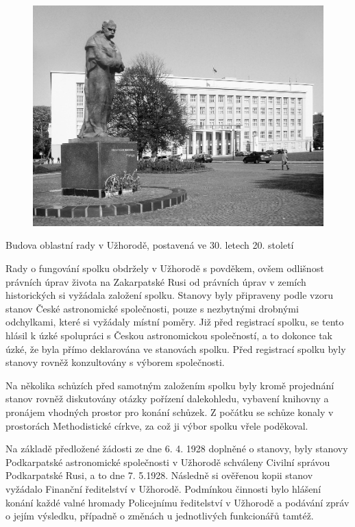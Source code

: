 \documentclass[10pt,a5paper,twoside]{book}
\begin{document}
\begin{figure}[!htbp]
 \centering
  \includegraphics*[width=12cm]{dum.jpg}
\end{figure}
Budova oblastní rady v Užhorodě, postavená ve 30. letech 20. století\\

\par Rady o fungování spolku obdržely v Užhorodě s povděkem, ovšem odlišnost právních úprav života na Zakarpatské Rusi od právních úprav v zemích historických si vyžádala založení spolku. Stanovy byly připraveny podle vzoru stanov České astronomické společnosti, pouze s nezbytnými drobnými odchylkami, které si vyžádaly místní poměry. Již před registrací spolku, se tento hlásil k úzké spolupráci s Českou astronomickou společností, a to dokonce tak úzké, že byla přímo deklarována ve stanovách spolku. Před registrací spolku byly stanovy rovněž konzultovány s výborem společnosti.
\par Na několika schůzích před samotným založením spolku byly kromě projednání stanov rovněž diskutovány otázky pořízení dalekohledu, vybavení knihovny a pronájem vhodných prostor pro konání schůzek. Z počátku se schůze konaly v prostorách Methodistické církve, za což ji výbor spolku vřele poděkoval.
\par Na základě předložené žádosti ze dne 6. 4. 1928 doplněné o stanovy, byly stanovy Podkarpatské astronomické společnosti v Užhorodě schváleny Civilní správou Podkarpatské Rusi, a to dne 7. 5.1928. Následně si ověřenou kopii stanov vyžádalo Finanční ředitelství v Užhorodě. Podmínkou činnosti bylo hlášení konání každé valné hromady Policejnímu ředitelství v Užhorodě a podávání zpráv o jejím výsledku, případně o změnách u jednotlivých funkcionářů tamtéž.
\end{document}
